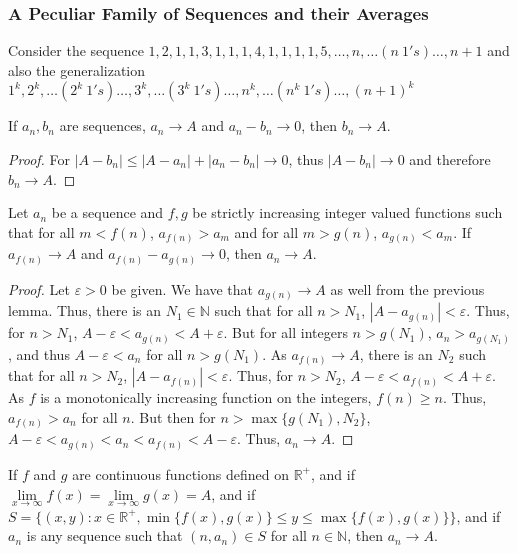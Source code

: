 \documentclass[crop=false,class=book,oneside]{standalone}
\begin{document}
            \subsubsection{A Peculiar Family of Sequences and their Averages}
            Consider the sequence $1,2,1,1,3,1,1,1,4,1,1,1,1,5,\hdots, n,\hdots (n\ 1's)\hdots, n+1$ and also the generalization $1^k, 2^k,\hdots (2^k\ 1's)\hdots, 3^k, \hdots (3^k\ 1's)\hdots, n^k, \hdots (n^k\ 1's)\hdots, (n+1)^k$
            \begin{lemma}
            If $a_n, b_n$ are sequences, $a_n\rightarrow A$ and $a_n-b_n\rightarrow 0$, then $b_n \rightarrow A$.
            \end{lemma}
            \begin{proof}
            For $|A-b_n| \leq |A-a_n|+|a_n-b_n| \rightarrow 0$, thus $|A-b_n|\rightarrow 0$ and therefore $b_n \rightarrow A$.
            \end{proof}
            \begin{lemma}
            Let $a_n$ be a sequence and $f,g$ be strictly increasing integer valued functions such that for all $m<f(n)$, $a_{f(n)}>a_m$ and for all $m>g(n)$, $a_{g(n)}<a_m$. If $a_{f(n)}\rightarrow A$ and $a_{f(n)}-a_{g(n)}\rightarrow 0$, then $a_n \rightarrow A$.
            \end{lemma}
            \begin{proof}
            Let $\varepsilon>0$ be given. We have that $a_{g(n)}\rightarrow A$ as well from the previous lemma. Thus, there is an $N_1 \in \mathbb{N}$ such that for all $n>N_1$, $|A-a_{g(n)}|<\varepsilon$. Thus, for $n>N_1$, $A-\varepsilon < a_{g(n)}<A+\varepsilon$. But for all integers $n>g(N_1)$, $a_n >a_{g(N_1)}$, and thus $A-\varepsilon < a_n$ for all $n>g(N_1)$. As $a_{f(n)}\rightarrow A$, there is an $N_2$ such that for all $n>N_2$, $|A-a_{f(n)}|<\varepsilon$. Thus, for $n>N_2$, $A-\varepsilon < a_{f(n)}<A+\varepsilon$. As $f$ is a monotonically increasing function on the integers, $f(n)\geq n$. Thus, $a_{f(n)}>a_n$ for all $n$. But then for $n>\max\{g(N_1),N_2\}$, $A-\varepsilon < a_{g(n)} < a_n < a_{f(n)}<A-\varepsilon$. Thus, $a_n \rightarrow A$.
            \end{proof}
            \begin{lemma}
            If $f$ and $g$ are continuous functions defined on $\mathbb{R}^+$, and if $\underset{x\rightarrow \infty}\lim f(x) = \underset{x\rightarrow \infty}\lim g(x)=A$, and if $S = \{(x,y):x\in \mathbb{R}^+,\min\{f(x),g(x)\}\leq y \leq \max\{f(x),g(x)\}\}$, and if $a_n$ is any sequence such that $(n,a_n)\in S$ for all $n\in \mathbb{N}$, then $a_n \rightarrow A$.
            \end{lemma}
\end{document}
